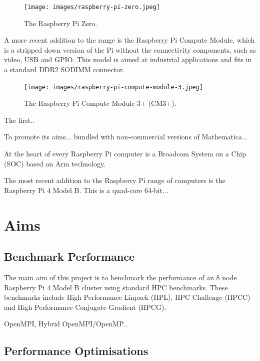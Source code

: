 \documentclass{report}
\begin{document}
\begin{figure}
	\centering	
	\texttt{[image: images/raspberry-pi-zero.jpeg]}
	\caption{The Raspberry Pi Zero.}
\end{figure}


A more recent addition to the range is the Raspberry Pi Compute Module, which is a stripped down version of the Pi without the connectivity components, such as video, USB and GPIO. This model is aimed at industrial applications and fits in a standard DDR2 SODIMM connector. 

\begin{figure}
	\centering	
	\texttt{[image: images/raspberry-pi-compute-module-3.jpeg]}
	\caption{The Raspberry Pi Compute Module 3+ (CM3+).}
\end{figure}



The first..


To promote its aims... bundled with non-commercial versions of Mathematica...



At the heart of every Raspberry Pi computer is a Broadcom System on a Chip (SOC) based on Arm technology.

The most recent addition to the Raspberry Pi range of computers is the Raspberry Pi 4 Model B. This is a quad-core 64-bit...






\section{Aims}

\subsection{Benchmark Performance}

The main aim of this project is to benchmark the performance of an 8 node Raspberry Pi 4 Model B cluster using standard HPC benchmarks. These benchmarks include High Performance Linpack (HPL), HPC Challenge (HPCC) and High Performance Conjugate Gradient (HPCG).

OpenMPI, Hybrid OpenMPI/OpenMP...


\subsection{Performance Optimisations}
\end{document}

